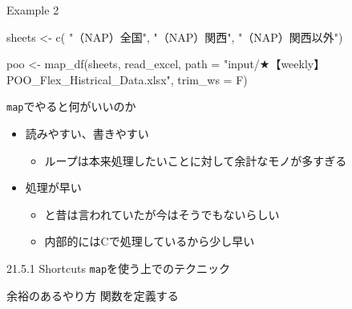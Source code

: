 \documentclass[
  ignorenonframetext,
  aspectratio=169]{beamer}
\newenvironment{Shaded}{\begin{snugshade}}{\end{snugshade}}
\newcommand{\AttributeTok}[1]{\textcolor[rgb]{0.77,0.63,0.00}{#1}}
\newcommand{\ControlFlowTok}[1]{\textcolor[rgb]{0.13,0.29,0.53}{\textbf{#1}}}
\newcommand{\FunctionTok}[1]{\textcolor[rgb]{0.00,0.00,0.00}{#1}}
\newcommand{\NormalTok}[1]{#1}
\newcommand{\OtherTok}[1]{\textcolor[rgb]{0.56,0.35,0.01}{#1}}
\newcommand{\SpecialCharTok}[1]{\textcolor[rgb]{0.00,0.00,0.00}{#1}}
\newcommand{\StringTok}[1]{\textcolor[rgb]{0.31,0.60,0.02}{#1}}
\providecommand{\tightlist}{%
  \setlength{\itemsep}{0pt}\setlength{\parskip}{0pt}}
\begin{document}
\begin{frame}[fragile]{Example 2}
\protect\hypertarget{example-2}{}
\begin{Shaded}
\begin{Highlighting}[]
\NormalTok{sheets }\OtherTok{\textless{}{-}} \FunctionTok{c}\NormalTok{( }\StringTok{"（NAP）全国"}\NormalTok{,}
        \StringTok{"（NAP）関西"}\NormalTok{,}
        \StringTok{"（NAP）関西以外"}\NormalTok{)}

\NormalTok{poo }\OtherTok{\textless{}{-}} \FunctionTok{map\_df}\NormalTok{(sheets,}
\NormalTok{       read\_excel,}
       \AttributeTok{path =} \StringTok{"input/★【weekly】POO\_Flex\_Histrical\_Data.xlsx"}\NormalTok{,}
       \AttributeTok{trim\_ws =}\NormalTok{ F)}
\end{Highlighting}
\end{Shaded}
\end{frame}

\begin{frame}{\texttt{map}でやると何がいいのか}
\protect\hypertarget{mapux3067ux3084ux308bux3068ux4f55ux304cux3044ux3044ux306eux304b}{}
\begin{itemize}
\tightlist
\item
  読みやすい、書きやすい

  \begin{itemize}
  \tightlist
  \item
    ループは本来処理したいことに対して余計なモノが多すぎる
  \end{itemize}
\item
  処理が早い

  \begin{itemize}
  \tightlist
  \item
    と昔は言われていたが今はそうでもないらしい
  \item
    内部的にはCで処理しているから少し早い
  \end{itemize}
\end{itemize}
\end{frame}

\begin{frame}[fragile]{21.5.1 Shortcuts}
\protect\hypertarget{shortcuts}{}
\texttt{map}を使う上でのテクニック
\end{frame}

\begin{frame}[fragile]{余裕のあるやり方}
\protect\hypertarget{ux4f59ux88d5ux306eux3042ux308bux3084ux308aux65b9}{}
関数を定義する

\begin{Shaded}
\end{Shaded}
\end{frame}
\end{document}
